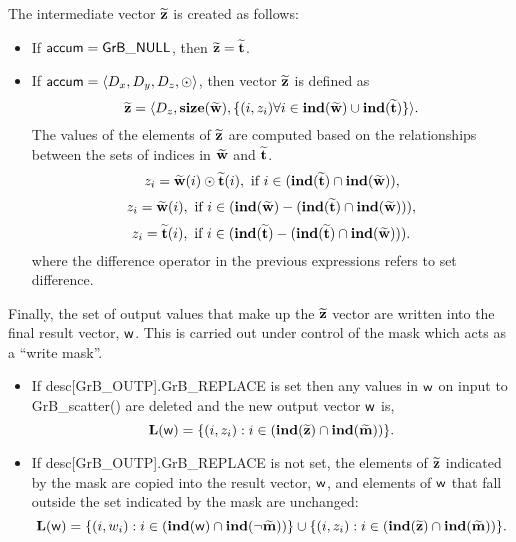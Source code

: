 The intermediate vector ${\bf \widetilde{z}}$ is created as follows:
\begin{itemize}
    \item If ${\sf accum} = {\sf GrB\_NULL}$, then 
    ${\bf \widetilde{z}} = {\bf \widetilde{t}}$.

    \item If ${\sf accum} = \langle D_x, D_y, D_z, \odot \rangle$, then vector 
    ${\bf \widetilde{z}}$ is defined as 
        \[ 
        {\bf \widetilde{z}} =
        \langle D_z, \bold{size}({\bf \widetilde{w}}), 
		\{(i,z_{i})  \forall i \in \bold{ind}({\bf \widetilde{w}}) \cup 
        \bold{ind}({\bf \widetilde{t}}) \} \rangle.\]
    The values of the elements of ${\bf \widetilde{z}}$ are computed based 
    on the relationships between the sets of indices in ${\bf \widetilde{w}}$ 
    and ${\bf \widetilde{t}}$.
\[
    z_{i} = {\bf \widetilde{w}}(i) \odot {\bf \widetilde{t}}(i), \ \mbox{if}\  
    i \in  (\bold{ind}({\bf \widetilde{t}}) \cap \bold{ind}({\bf \widetilde{w}})),
\]
\[
    z_{i} = {\bf \widetilde{w}}(i), \ \mbox{if}\  
    i \in  (\bold{ind}({\bf \widetilde{w}}) - (\bold{ind}({\bf \widetilde{t}})
    \cap \bold{ind}({\bf \widetilde{w}}))),
\]
\[
    z_{i} = {\bf \widetilde{t}}(i), \ \mbox{if}\  i \in  
    (\bold{ind}({\bf \widetilde{t}}) - (\bold{ind}({\bf \widetilde{t}}) 
    \cap \bold{ind}({\bf \widetilde{w}}))).
\]
where the difference operator in the previous expressions refers to set difference.
\end{itemize}

Finally, the set of output values that make up the ${\bf \widetilde{z}}$ 
vector are written into the final result vector, ${\sf w}$. 
This is carried out under control of the mask which acts as a ``write mask''.
\begin{itemize}
\item If {\sf desc[GrB\_OUTP].GrB\_REPLACE} is set then any values in ${\sf w}$ 
on input to {\sf GrB\_scatter()} are deleted and the new output vector ${\sf w}$ is,
\[ \bold{L}({\sf w}) = \{(i,z_{i}) : i \in (\bold{ind}({\bf \widetilde{z}}) 
\cap \bold{ind}({\bf \widetilde{m}})) \}. \]

\item If {\sf desc[GrB\_OUTP].GrB\_REPLACE} is not set, the elements of 
${\bf \widetilde{z}}$ indicated by 
the mask are copied into the result vector, ${\sf w}$, and elements of 
${\sf w}$ that fall outside the set indicated by the mask are unchanged:
\[ \bold{L}({\sf w}) = \{(i,w_{i}) : i \in (\bold{ind}({\bf \sf w}) 
\cap \bold{ind}(\neg {\bf \widetilde{m}})) \} \cup \{(i,z_{i}) : i \in 
(\bold{ind}({\bf \widetilde{z}}) \cap \bold{ind}({\bf \widetilde{m}})) \}. \]
\end{itemize}

